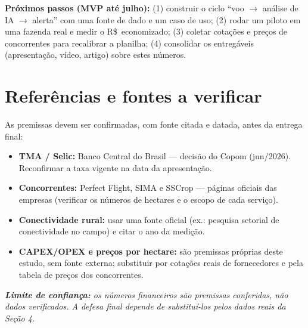 \documentclass[12pt,a4paper]{article}
\newcommand{\rs}{R\$}
\begin{document}
\textbf{Próximos passos (MVP até julho):} (1) construir o ciclo ``voo $\to$ análise de IA $\to$ alerta'' com uma fonte de dado e um caso de uso; (2) rodar um piloto em uma fazenda real e medir o \rs~economizado; (3) coletar cotações e preços de concorrentes para recalibrar a planilha; (4) consolidar os entregáveis (apresentação, vídeo, artigo) sobre estes números.

\section{Referências e fontes a verificar}
As premissas devem ser confirmadas, com fonte citada e datada, antes da entrega final:
\begin{itemize}
\item \textbf{TMA / Selic:} Banco Central do Brasil --- decisão do Copom (jun/2026). Reconfirmar a taxa vigente na data da apresentação.
\item \textbf{Concorrentes:} Perfect Flight, SIMA e SSCrop --- páginas oficiais das empresas (verificar os números de hectares e o escopo de cada serviço).
\item \textbf{Conectividade rural:} usar uma fonte oficial (ex.: pesquisa setorial de conectividade no campo) e citar o ano da medição.
\item \textbf{CAPEX/OPEX e preços por hectare:} são premissas próprias deste estudo, sem fonte externa; substituir por cotações reais de fornecedores e pela tabela de preços dos concorrentes.
\end{itemize}

\vspace{4pt}
\noindent\colorbox{accent!8}{\parbox{\dimexpr\textwidth-2\fboxsep}{\small\itshape \textbf{Limite de confiança:} os números financeiros são premissas conferidas, não dados verificados. A defesa final depende de substituí-los pelos dados reais da Seção 4.}}
\end{document}

